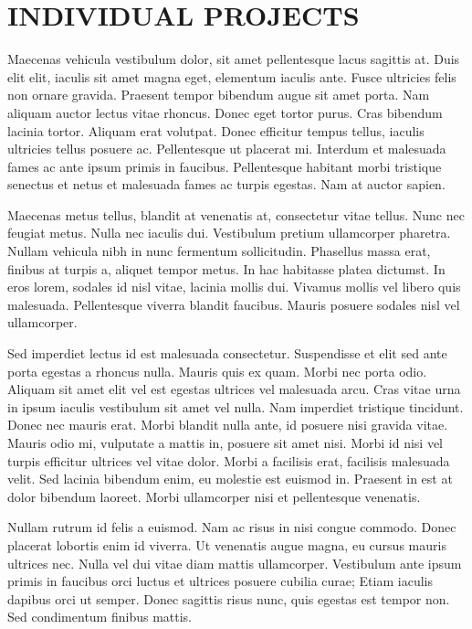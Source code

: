 \documentclass[
  a4paper,
]{scrreprt}
\begin{document}
\part{INDIVIDUAL PROJECTS}

Maecenas vehicula vestibulum dolor, sit amet pellentesque lacus sagittis
at. Duis elit elit, iaculis sit amet magna eget, elementum iaculis ante.
Fusce ultricies felis non ornare gravida. Praesent tempor bibendum augue
sit amet porta. Nam aliquam auctor lectus vitae rhoncus. Donec eget
tortor purus. Cras bibendum lacinia tortor. Aliquam erat volutpat. Donec
efficitur tempus tellus, iaculis ultricies tellus posuere ac.
Pellentesque ut placerat mi. Interdum et malesuada fames ac ante ipsum
primis in faucibus. Pellentesque habitant morbi tristique senectus et
netus et malesuada fames ac turpis egestas. Nam at auctor sapien.

Maecenas metus tellus, blandit at venenatis at, consectetur vitae
tellus. Nunc nec feugiat metus. Nulla nec iaculis dui. Vestibulum
pretium ullamcorper pharetra. Nullam vehicula nibh in nunc fermentum
sollicitudin. Phasellus massa erat, finibus at turpis a, aliquet tempor
metus. In hac habitasse platea dictumst. In eros lorem, sodales id nisl
vitae, lacinia mollis dui. Vivamus mollis vel libero quis malesuada.
Pellentesque viverra blandit faucibus. Mauris posuere sodales nisl vel
ullamcorper.

Sed imperdiet lectus id est malesuada consectetur. Suspendisse et elit
sed ante porta egestas a rhoncus nulla. Mauris quis ex quam. Morbi nec
porta odio. Aliquam sit amet elit vel est egestas ultrices vel malesuada
arcu. Cras vitae urna in ipsum iaculis vestibulum sit amet vel nulla.
Nam imperdiet tristique tincidunt. Donec nec mauris erat. Morbi blandit
nulla ante, id posuere nisi gravida vitae. Mauris odio mi, vulputate a
mattis in, posuere sit amet nisi. Morbi id nisi vel turpis efficitur
ultrices vel vitae dolor. Morbi a facilisis erat, facilisis malesuada
velit. Sed lacinia bibendum enim, eu molestie est euismod in. Praesent
in est at dolor bibendum laoreet. Morbi ullamcorper nisi et pellentesque
venenatis.

Nullam rutrum id felis a euismod. Nam ac risus in nisi congue commodo.
Donec placerat lobortis enim id viverra. Ut venenatis augue magna, eu
cursus mauris ultrices nec. Nulla vel dui vitae diam mattis ullamcorper.
Vestibulum ante ipsum primis in faucibus orci luctus et ultrices posuere
cubilia curae; Etiam iaculis dapibus orci ut semper. Donec sagittis
risus nunc, quis egestas est tempor non. Sed condimentum finibus mattis.
\end{document}
